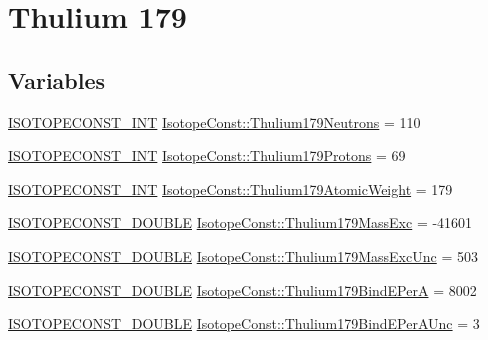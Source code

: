 \hypertarget{group___isotope_const-_thulium-_tm179}{}\section{Thulium 179}
\label{group___isotope_const-_thulium-_tm179}
\subsection*{Variables}
\begin{DoxyCompactItemize}
\item 
\mbox{\hyperlink{group___isotope_const-_macros_ga5f18360b3e99483a35c32d789e62621c}{I\+S\+O\+T\+O\+P\+E\+C\+O\+N\+S\+T\+\_\+\+I\+NT}} \mbox{\hyperlink{group___isotope_const-_thulium-_tm179_ga580f970ae92bb6d955415628bc47a4f8}{Isotope\+Const\+::\+Thulium179\+Neutrons}} = 110
\item 
\mbox{\hyperlink{group___isotope_const-_macros_ga5f18360b3e99483a35c32d789e62621c}{I\+S\+O\+T\+O\+P\+E\+C\+O\+N\+S\+T\+\_\+\+I\+NT}} \mbox{\hyperlink{group___isotope_const-_thulium-_tm179_gaab689857f6233827091c7c60baaeaeb5}{Isotope\+Const\+::\+Thulium179\+Protons}} = 69
\item 
\mbox{\hyperlink{group___isotope_const-_macros_ga5f18360b3e99483a35c32d789e62621c}{I\+S\+O\+T\+O\+P\+E\+C\+O\+N\+S\+T\+\_\+\+I\+NT}} \mbox{\hyperlink{group___isotope_const-_thulium-_tm179_ga67238a294d910f40c7d6e5e04d511dc6}{Isotope\+Const\+::\+Thulium179\+Atomic\+Weight}} = 179
\item 
\mbox{\hyperlink{group___isotope_const-_macros_ga8f45a7272ce02c0b4c65c44636ed719a}{I\+S\+O\+T\+O\+P\+E\+C\+O\+N\+S\+T\+\_\+\+D\+O\+U\+B\+LE}} \mbox{\hyperlink{group___isotope_const-_thulium-_tm179_gac2ed472f39003d2111b4a7e7913d3837}{Isotope\+Const\+::\+Thulium179\+Mass\+Exc}} = -\/41601
\item 
\mbox{\hyperlink{group___isotope_const-_macros_ga8f45a7272ce02c0b4c65c44636ed719a}{I\+S\+O\+T\+O\+P\+E\+C\+O\+N\+S\+T\+\_\+\+D\+O\+U\+B\+LE}} \mbox{\hyperlink{group___isotope_const-_thulium-_tm179_ga0bac36201347c778ef41d23cab5d146f}{Isotope\+Const\+::\+Thulium179\+Mass\+Exc\+Unc}} = 503
\item 
\mbox{\hyperlink{group___isotope_const-_macros_ga8f45a7272ce02c0b4c65c44636ed719a}{I\+S\+O\+T\+O\+P\+E\+C\+O\+N\+S\+T\+\_\+\+D\+O\+U\+B\+LE}} \mbox{\hyperlink{group___isotope_const-_thulium-_tm179_ga8a939ef19dc99bb3a862e6ecd74f0fd5}{Isotope\+Const\+::\+Thulium179\+Bind\+E\+PerA}} = 8002
\item 
\mbox{\hyperlink{group___isotope_const-_macros_ga8f45a7272ce02c0b4c65c44636ed719a}{I\+S\+O\+T\+O\+P\+E\+C\+O\+N\+S\+T\+\_\+\+D\+O\+U\+B\+LE}} \mbox{\hyperlink{group___isotope_const-_thulium-_tm179_gac22641ec85462804e17ba64eaf4ad028}{Isotope\+Const\+::\+Thulium179\+Bind\+E\+Per\+A\+Unc}} = 3

\end{DoxyCompactItemize}
